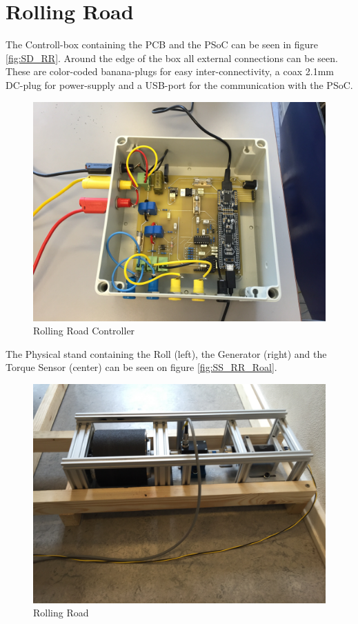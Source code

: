 \section{Rolling Road}
The Controll-box containing the PCB and the PSoC can be seen in figure \vref{fig:SD_RR}. Around the edge of the box all external connections can be seen. These are color-coded banana-plugs for easy inter-connectivity, a coax 2.1mm DC-plug for power-supply and a USB-port for the communication with the PSoC. 

\begin{figure}[H]
	\centering
	\includegraphics[width=0.7\linewidth]{SubPages/Images/SD_RR}
	\caption{Rolling Road Controller}
	\label{fig:SD_RR}
\end{figure}

\newpage
The Physical stand containing the Roll (left), the Generator (right) and the Torque Sensor (center) can be seen on figure \vref{fig:SS_RR_Roal}.

\begin{figure}[H]
	\centering
	\includegraphics[width=0.7\linewidth]{SubPages/Images/SS_RR_Roal}
	\caption{Rolling Road}
	\label{fig:SS_RR_Roal}
\end{figure}

